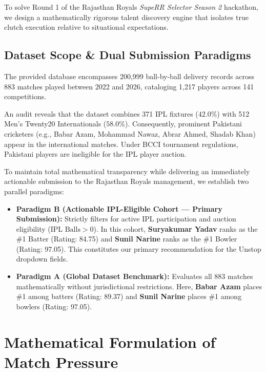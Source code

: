 \documentclass[11pt,a4paper]{article}
\begin{document}
To solve Round 1 of the Rajasthan Royals \textit{SupeRR Selector Season 2} hackathon, we design a mathematically rigorous talent discovery engine that isolates true clutch execution relative to situational expectations.

\subsection{Dataset Scope \& Dual Submission Paradigms}
The provided database encompasses 200,999 ball-by-ball delivery records across 883 matches played between 2022 and 2026, cataloging 1,217 players across 141 competitions.

An audit reveals that the dataset combines 371 IPL fixtures ($42.0\%$) with 512 Men's Twenty20 Internationals ($58.0\%$). Consequently, prominent Pakistani cricketers (e.g., Babar Azam, Mohammad Nawaz, Abrar Ahmed, Shadab Khan) appear in the international matches. Under BCCI tournament regulations, Pakistani players are ineligible for the IPL player auction. 

To maintain total mathematical transparency while delivering an immediately actionable submission to the Rajasthan Royals management, we establish two parallel paradigms:
\begin{itemize}[leftmargin=*,itemsep=2pt]
    \item \textbf{Paradigm B (Actionable IPL-Eligible Cohort --- Primary Submission):} Strictly filters for active IPL participation and auction eligibility ($\text{IPL Balls} > 0$). In this cohort, \textbf{Suryakumar Yadav} ranks as the \#1 Batter (Rating: 84.75) and \textbf{Sunil Narine} ranks as the \#1 Bowler (Rating: 97.05). This constitutes our primary recommendation for the Unstop dropdown fields.
    \item \textbf{Paradigm A (Global Dataset Benchmark):} Evaluates all 883 matches mathematically without jurisdictional restrictions. Here, \textbf{Babar Azam} places \#1 among batters (Rating: 89.37) and \textbf{Sunil Narine} places \#1 among bowlers (Rating: 97.05).
\end{itemize}

\section{Mathematical Formulation of Match Pressure}
\end{document}

